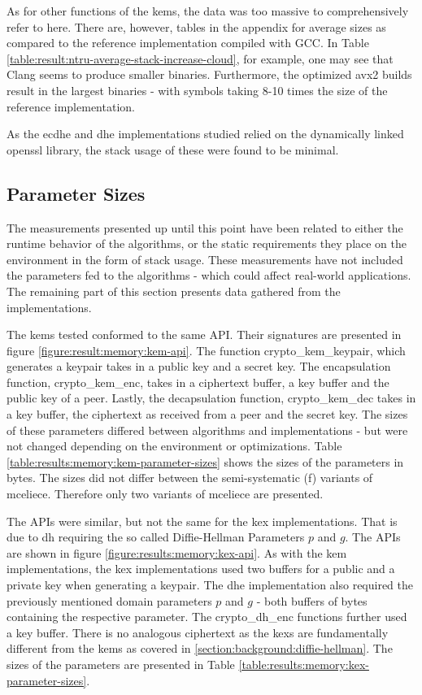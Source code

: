 \noindent As for other functions of the \glspl{kem}, the data was too massive to comprehensively refer to here. There are, however, tables in the appendix for average sizes as compared to the reference implementation compiled with GCC. In Table \ref{table:result:ntru-average-stack-increase-cloud}, for example, one may see that Clang seems to produce smaller binaries. Furthermore, the optimized \gls{avx2} builds result in the largest binaries - with symbols taking 8-10 times the size of the reference implementation.

As the \gls{ecdhe} and \gls{dhe} implementations studied relied on the dynamically linked \gls{openssl} library, the stack usage of these were found to be minimal.

\subsection{Parameter Sizes}

The measurements presented up until this point have been related to either the runtime behavior of the algorithms, or the static requirements they place on the environment in the form of stack usage. These measurements have not included the parameters fed to the algorithms - which could affect real-world applications. The remaining part of this section presents data gathered from the implementations.

The \glspl{kem} tested conformed to the same API. Their signatures are presented in figure \ref{figure:result:memory:kem-api}. The function crypto\_kem\_keypair, which generates a keypair takes in a public key and a secret key. The encapsulation function, crypto\_kem\_enc, takes in a ciphertext buffer, a key buffer and the public key of a peer. Lastly, the decapsulation function, crypto\_kem\_dec takes in a key buffer, the ciphertext as received from a peer and the secret key. The sizes of these parameters differed between algorithms and implementations - but were not changed depending on the environment or optimizations. Table \ref{table:results:memory:kem-parameter-sizes} shows the sizes of the parameters in bytes. The sizes did not differ between the semi-systematic (f) variants of \gls{mceliece}. Therefore only two variants of \gls{mceliece} are presented.

\noindent The APIs were similar, but not the same for the \gls{kex} implementations. That is due to \gls{dh} requiring the so called Diffie-Hellman Parameters $p$ and $g$. The APIs are shown in figure \ref{figure:results:memory:kex-api}. As with the \gls{kem} implementations, the \gls{kex} implementations used two buffers for a public and a private key when generating a keypair. The \gls{dhe} implementation also required the previously mentioned domain parameters $p$ and $g$ - both buffers of bytes containing the respective parameter. The crypto\_dh\_enc functions further used a key buffer. There is no analogous ciphertext as the \glspl{kex} are fundamentally different from the \glspl{kem} as covered in \ref{section:background:diffie-hellman}. The sizes of the parameters are presented in Table \ref{table:results:memory:kex-parameter-sizes}.

